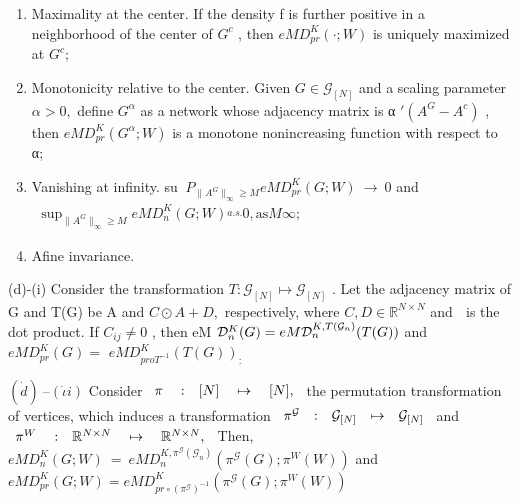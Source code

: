 \documentclass[
  10
]{article}
\begin{document}
\begin{enumerate}
\def\labelenumi{(\alph{enumi})}
\item
  Maximality at the center. If the density f is further positive in a
  neighborhood of the center of \(G ^ { c }\) , then
  \(e M D _ { p r } ^ { K } ( \cdot ; W )\) is uniquely maximized at
  \(G ^ { c } ;\)
\item
  Monotonicity relative to the center. Given
  \(G \in { \mathcal { G } } _ { [ N ] }\) and a scaling parameter
  \(\alpha > 0 ,\) define \(G ^ { \alpha }\) as a network whose
  adjacency matrix is α \(\prime ( A ^ { G } - A ^ { c } )\) , then
  \(e M D _ { p r } ^ { K } \left( G ^ { \alpha } ; W \right)\) is a
  monotone nonincreasing function with respect to α;
\item
  Vanishing at infinity. su
  \(\ P _ { \| A ^ { G } \| _ { \infty } \geq M } e M D _ { p r } ^ { K } ( G ; W ) ~ \to ~ 0\)
  and
  \(\begin{array} { r } { \operatorname* { s u p } _ { \| A ^ { G } \| _ { \infty } \geq M } e M D _ { n } ^ { K } ( G ; W ) \stackrel { a . s . } {  } 0 , \mathrm { a s } M  \infty ; } \end{array}\)
\item
  Afine invariance.
\end{enumerate}

(d)-(i) Consider the transformation
\(T : \mathcal { G } _ { [ N ] } \mapsto \mathcal { G } _ { [ N ] }\) .
Let the adjacency matrix of G and T(G) be A and \(C \odot A + D ,\)
respectively, where \(C , D \in \mathbb { R } ^ { N \times N }\) and  is
the dot product. If \(C _ { i j } \neq 0\) , then eM
\({ \cal D } _ { n } ^ { K } ( G ) = e M { \cal D } _ { n } ^ { K , T ( { \mathcal G } _ { n } ) } ( T ( G ) )\)
and \(e M D _ { p r } ^ { K } ( G ) =\)
\(e M D _ { p r o T ^ { - 1 } } ^ { K } ( T ( G ) ) _ { \mathrm { : } }\)

\(( \dot { d } ) \ – ( \dot { \iota } i )\) Consider
\(\begin{array} { r l r } { \pi } & { { } : } & { [ N ] \quad \mapsto \quad [ N ] , } \end{array}\)
the permutation transformation of vertices, which induces a
transformation
\(\begin{array} { r c c c c l } { \pi ^ { \mathcal { G } } } & { : } & { \mathcal { G } _ { [ N ] } } & { \mapsto } & { \mathcal { G } _ { [ N ] } } \end{array}\)
and
\(\begin{array} { r l r } { \pi ^ { W } } & { { } : } & { \mathbb { R } ^ { N \times N } \quad \mapsto \quad \mathbb { R } ^ { N \times N } , } \end{array}\)
Then,
\(e M D _ { n } ^ { K } ( G ; W ) ~ = ~ e M D _ { n } ^ { K , \pi ^ { \mathcal { G } } ( { \mathcal G } _ { n } ) } \left( \pi ^ { \mathcal { G } } \left( G \right) ; \pi ^ { W } ( W ) \right)\)
and
\(e M D _ { p r } ^ { K } ( G ; W ) = e M D _ { p r \circ \left( \pi ^ { \mathcal { G } } \right) ^ { - 1 } } ^ { K } \left( \pi ^ { \mathcal { G } } \left( G \right) ; \pi ^ { W } ( W ) \right)\)
\end{document}
